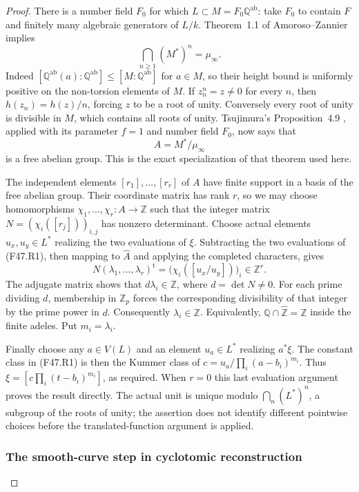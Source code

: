 \begin{proof}
There is a number field $F_0$ for which $L\subset M=F_0\mathbb
Q^{\mathrm{ab}}$: take $F_0$ to contain $F$ and finitely many algebraic
generators of $L/k$. Theorem~1.1 of Amoroso--Zannier \citep{AmorosoZannier2000} implies
\[
 \bigcap_{n\ge1}(M^*)^n=\mu_\infty.
                                                        \tag{F47.R3}
\]
Indeed $[\mathbb Q^{\mathrm{ab}}(a):\mathbb Q^{\mathrm{ab}}]
\le [M:\mathbb Q^{\mathrm{ab}}]$ for $a\in M$, so their height bound
is uniformly positive on the non-torsion elements of $M$. If
$z_n^n=z\ne0$ for every $n$, then $h(z_n)=h(z)/n$, forcing $z$ to be
a root of unity. Conversely every root of unity is divisible in $M$,
which contains all roots of unity. Tsujimura's Proposition~4.9 \citep{Tsujimura2022}, applied with its parameter $f=1$ and number field
$F_0$, now says that
\[
 A=M^*/\mu_\infty
\]
is a free abelian group. This is the exact specialization of that
theorem used here.

The independent elements $[r_1],\ldots,[r_r]$ of $A$ have finite
support in a basis of the free abelian group. Their coordinate matrix
has rank $r$, so we may choose homomorphisms
$\chi_1,\ldots,\chi_r:A\to\mathbb Z$ such that the integer matrix
$N=(\chi_i([r_j]))_{i,j}$ has nonzero determinant. Choose actual
elements $u_x,u_y\in L^*$ realizing the two evaluations of $\xi$.
Subtracting the two evaluations of (F47.R1), then mapping to
$\widehat A$ and applying the completed characters, gives
\[
 N(\lambda_1,\ldots,\lambda_r)^{\mathrm t}
   =\bigl(\chi_i([u_x/u_y])\bigr)_i\in\mathbb Z^r.
                                                        \tag{F47.R4}
\]
The adjugate matrix shows that
$d\lambda_i\in\mathbb Z$, where $d=\det N\ne0$.
For each prime dividing $d$, membership in $\mathbb Z_p$ forces the
corresponding divisibility of that integer by the prime power in $d$.
Consequently $\lambda_i\in\mathbb Z$. Equivalently,
$\mathbb Q\cap\widehat{\mathbb Z}=\mathbb Z$ inside the finite
adeles. Put $m_i=\lambda_i$.

Finally choose any $a\in V(L)$ and an element $u_a\in L^*$ realizing
$a^*\xi$. The constant class in (F47.R1) is then the Kummer class of
$c=u_a/\prod_i(a-b_i)^{m_i}$. Thus
$\xi=[c\prod_i(t-b_i)^{m_i}]$, as required. When $r=0$ this last
evaluation argument proves the result directly. The actual unit is
unique modulo $\bigcap_n(L^*)^n$, a subgroup of the roots of unity;
the assertion does not identify different pointwise choices before
the translated-function argument is applied.


\subsubsection*{The smooth-curve step in cyclotomic reconstruction}


\end{proof}
